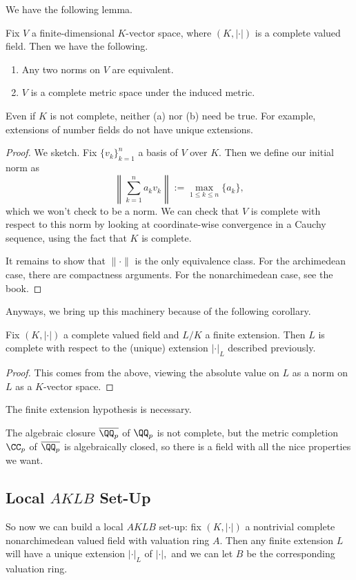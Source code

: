 \documentclass[../notes.tex]{subfiles}
\begin{document}
We have the following lemma.
\begin{lemma}
	Fix $V$ a finite-dimensional $K$-vector space, where $(K,|\cdot|)$ is a complete valued field. Then we have the following.
	\begin{enumerate}[label=(\alph*)]
		\item Any two norms on $V$ are equivalent.
		\item $V$ is a complete metric space under the induced metric.
	\end{enumerate}
\end{lemma}
\begin{remark}
	Even if $K$ is not complete, neither (a) nor (b) need be true. For example, extensions of number fields do not have unique extensions.
\end{remark}
\begin{proof}
	We sketch. Fix $\{v_k\}_{k=1}^n$ a basis of $V$ over $K.$ Then we define our initial norm as
	\[\left\lVert\sum_{k=1}^na_kv_k\right\rVert:=\max_{1\le k\le n}\{a_k\},\]
	which we won't check to be a norm. We can check that $V$ is complete with respect to this norm by looking at coordinate-wise convergence in a Cauchy sequence, using the fact that $K$ is complete.

	It remains to show that $\lVert\cdot\rVert$ is the only equivalence class. For the archimedean case, there are compactness arguments. For the nonarchimedean case, see the book.
\end{proof}
Anyways, we bring up this machinery because of the following corollary.
\begin{corollary}
	Fix $(K,|\cdot|)$ a complete valued field and $L/K$ a finite extension. Then $L$ is complete with respect to the (unique) extension $|\cdot|_L$ described previously.
\end{corollary}
\begin{proof}
	This comes from the above, viewing the absolute value on $L$ as a norm on $L$ as a $K$-vector space.
\end{proof}
The finite extension hypothesis is necessary.
\begin{example}
	The algebraic closure $\overline{\QQ_p}$ of $\QQ_p$ is not complete, but the metric completion $\CC_p$ of $\overline{\QQ_p}$ is algebraically closed, so there is a field with all the nice properties we want.
\end{example}

\subsection{Local \texorpdfstring{$AKLB$}{} Set-Up}
So now we can build a local $AKLB$ set-up: fix $(K,|\cdot|)$ a nontrivial complete nonarchimedean valued field with valuation ring $A.$ Then any finite extension $L$ will have a unique extension $|\cdot|_L$ of $|\cdot|,$ and we can let $B$ be the corresponding valuation ring.
\end{document}
